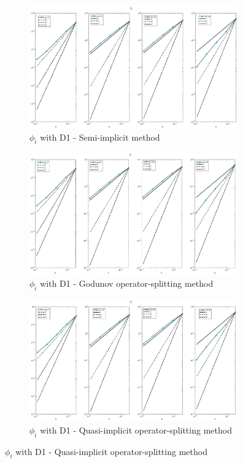 \documentclass[a4paper,11pt]{article}
\begin{document}
\begin{figure}[h]
\begin{center}
\end{center}
\begin{subfigure}{0.5\textwidth}
\includegraphics[width = 9cm]{./D1_Phii_1.jpg}
\caption*{$\phi_i$ with D1 - Semi-implicit method}
\end{subfigure}
\begin{subfigure}{0.5\textwidth}
\includegraphics[width =9cm]{./D1_Phii_1_GO.jpg}
\caption*{$\phi_i$ with D1 - Godunov operator-splitting method}
\end{subfigure}
\begin{center}
\begin{subfigure}{0.5\textwidth}
\includegraphics[width =9cm]{./D1_Phii_1_OS.jpg}
\caption*{$\phi_i$ with D1 - Quasi-implicit operator-splitting method}
\end{subfigure}
\end{center}
\end{figure}

\newpage
\end{document}

